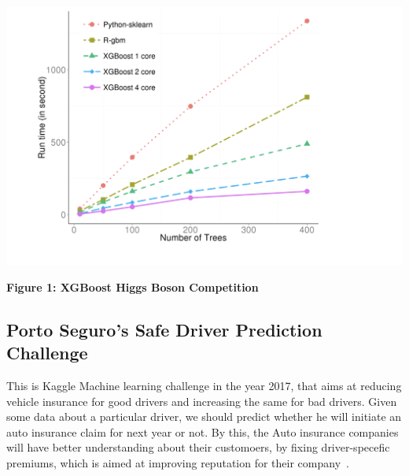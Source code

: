 \begin{center}
\includegraphics[scale=0.35]{images/Runtime-vs-Number-of-trees.png}
\label{s:XGBoost-runtime-comparision}
\end{center}
\textbf{Figure 1: XGBoost Higgs Boson Competition
~\cite{hid-sp18-401-XGBoost-runtime-comparision-image}}

\subsection{Porto Seguro's Safe Driver Prediction Challenge} 

This is Kaggle Machine learning challenge in the year 2017, that aims at
reducing vehicle insurance for good drivers and increasing the same for bad
drivers. Given some data about a particular driver, we should predict whether
he will initiate an auto insurance claim for next year or not. By this, the
Auto insurance companies  will have better understanding about their
customoers, by fixing driver-specefic premiums, which is aimed at improving
reputation for their company~\cite{hid-sp18-401-Kaggle-Porto-Seguro}.

